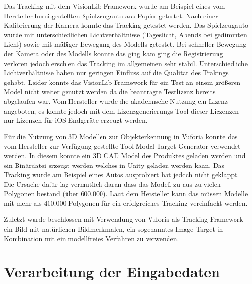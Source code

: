 Das Tracking mit dem VisionLib Framework wurde am Beispiel eines vom Hersteller bereitgestellten Spielzeugauto aus Papier getestet. Nach einer Kalibrierung der Kamera konnte das Tracking getestet werden. Das Spielzeugauto wurde mit unterschiedlichen
Lichtverhältnisse (Tageslicht, Abends bei gedimmten Licht) sowie mit mäßiger Bewegung des Modells getestet. Bei schneller Bewegung der Kamera oder des Modells konnte das ging kam ging die Registrierung verloren jedoch erschien das Tracking im allgemeinen sehr stabil.
Unterschiedliche Lichtverhältnisse haben nur geringen Einfluss auf die Qualität des Trakings gehabt. Leider konnte das VisionLib Framework für ein Test an einem größeren Model nicht weiter genutzt werden da die beantragte Testlizenz bereits abgelaufen war. Vom Hersteller wurde die akademische Nutzung ein Lizenz angeboten, es konnte jedoch mit dem Lizenzgenerierungs-Tool dieser Liezenzen nur Lizenzen für iOS Endgeräte erzeugt werden. 

Für die Nutzung von 3D Modellen zur Objekterkennung in Vuforia konnte das vom Hersteller zur Verfügung gestellte Tool Model Target Generator verwendet werden. In diesem konnte ein 3D CAD Model des Produktes geladen werden und ein Binärdatei erzeugt werden welches 
in Unity geladen werden kann. Das Tracking wurde am Beispiel eines Autos ausprobiert hat jedoch nicht geklappt. Die Ursache dafür lag vermutlich daran dass das Modell zu aus zu vielen Polygonen bestand (über 600.000). Laut dem Hersteller kann das müssen Modelle mit mehr als 400.000 Polygonen für 
ein erfolgreiches Tracking vereinfacht werden. 

Zuletzt wurde beschlossen mit Verwendung von Vuforia als Tracking Framework ein Bild mit natürlichen Bildmerkmalen, ein sogenanntes Image Target in Kombination mit ein modellfreies Verfahren zu verwenden.


\section{Verarbeitung der Eingabedaten}


